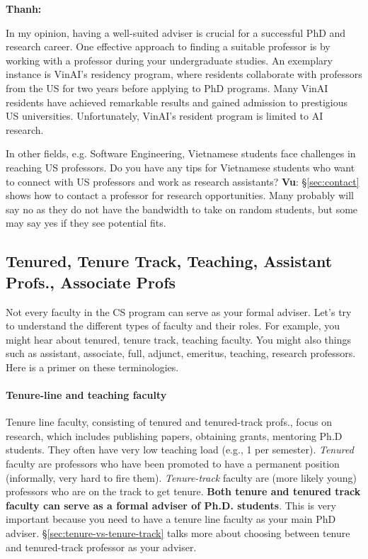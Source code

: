 \documentclass[oneside,11pt]{memoir}
\newenvironment{commentbox}[1][]{
\small
    \begin{mybox}
    {\small \textbf{#1}}
 }{
   \end{mybox}
}
\begin{document}
\begin{commentbox}[Thanh:]
    In my opinion, having a well-suited adviser is crucial for a successful PhD and research career. One effective approach to finding a suitable professor is by working with a professor during your undergraduate studies. An exemplary instance is VinAI's residency program, where residents collaborate with professors from the US for two years before applying to PhD programs. Many VinAI residents have achieved remarkable results and gained admission to prestigious US universities. Unfortunately, VinAI's resident program is limited to AI research. 
    
    In other fields, e.g. Software Engineering, Vietnamese students face challenges in reaching US professors. Do you have any tips for Vietnamese students who want to connect with US professors and work as research assistants? 
    \tcblower
    \textbf{Vu}: \S\ref{sec:contact} shows how to contact a professor for research opportunities. Many probably will say no as they do not have the bandwidth to take on random students, but some may say yes if they see potential fits.  
\end{commentbox}





\subsection{Tenured, Tenure Track, Teaching,  Assistant Profs., Associate Profs}\label{sec:faculty-types}

Not every faculty in the CS program can serve as your formal adviser. Let's try to understand the different types of faculty and their roles. For example, you might hear about tenured,  tenure track, teaching faculty.  You might also things such as assistant, associate, full, adjunct, emeritus, teaching, research professors. Here is a primer on these terminologies.

\paragraph{Tenure-line and teaching faculty} Tenure line faculty, consisting of tenured and tenured-track profs., focus on research, which includes publishing papers, obtaining grants, mentoring Ph.D students.  They often have very low teaching load (e.g., 1 per semester). \emph{Tenured} faculty are professors who have been promoted to have a permanent position (informally, very hard to fire them).   \emph{Tenure-track} faculty are (more likely young) professors who are on the track to get tenure.  \textbf{Both tenure and tenured track faculty can serve as a formal adviser of Ph.D. students}. This is very important because you need to have a tenure line faculty as your main PhD adviser. \S\ref{sec:tenure-vs-tenure-track} talks more about choosing between tenure and tenured-track professor as your adviser.
\end{document}
